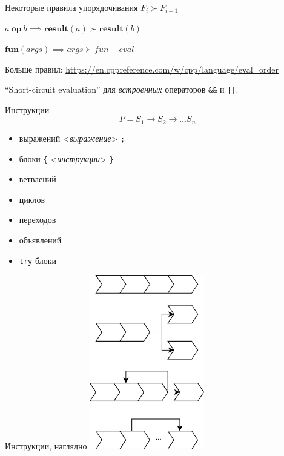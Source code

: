 \documentclass[unknownkeysallowed,xcolor=table]{beamer}
\begin{document}
\begin{frame}{Некоторые правила упорядочивания}
    $F_i \succ F_{i+1}$

    \vspace{2em}

    $a \: \mathbf{op} \: b \implies \mathbf{result}(a) \succ \mathbf{result}(b)$

    \vspace{2em}

    $\mathbf{fun}(args) \implies args \succ fun-eval$

    \vspace{2em}

    Больше правил: \url{https://en.cppreference.com/w/cpp/language/eval_order}

    \vspace{2em}

    ``Short-circuit evaluation'' для \emph{встроенных} операторов \lstinline{&&} и \lstinline{||}.
\end{frame}

\begin{frame}[fragile]{Инструкции}
  \[
    P = S_1 \to S_2 \to \dotso S_n
  \]
  \begin{itemize}
    \item выражений <\emph{выражение}> \lstinline{;} \vspace{0.5em}
    \item блоки \lstinline|{| <\emph{инструкции}> \lstinline|}| \vspace{0.5em}
    \item ветвлений \vspace{0.5em}
    \item циклов \vspace{0.5em}
    \item переходов \vspace{0.5em}
    \item объявлений \vspace{0.5em}
    \item \lstinline{try} блоки
  \end{itemize}
\end{frame}

\begin{frame}{Инструкции, наглядно}
  \hspace*{3cm}\includegraphics[align=c,width=5cm,keepaspectratio]{images/control.png}
\end{frame}
\end{document}
